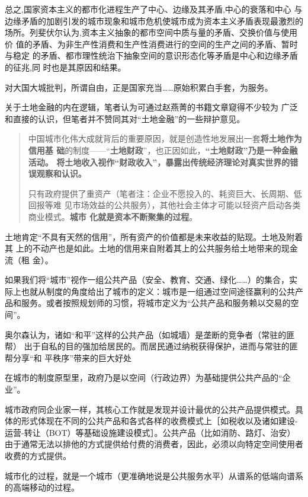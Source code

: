 总之,国家资本主义的都市化进程生产了中心、边缘及其矛盾,中心的衰落和中心
与边缘矛盾的加剧引发的城市现象和城市危机使城市成为资本主义矛盾表现最激烈的
场所。列斐伏尔认为,资本主义抽象的都市空间中质与量的矛盾、交换价值与使用价
值的矛盾、为非生产性消费和生产性消费进行的空间的生产之间的矛盾、暂时与稳定
的矛盾、都市理性统治下抽象空间的意识形态化等矛盾是中心和边缘矛盾的征兆,同
时也是其原因和结果。



对大国大城批判，所谓自由，正是国家充当……原始积累白手套，为服务。


关于土地金融的内在逻辑，笔者认为可通过赵燕菁的书籍文章\cite{dajueqi}窥得不少较为
广泛和直接的认识，但笔者并不赞同其对“土地金融”的一些辩护意见。
\begin{quotation}
  中国城市化伟大成就背后的重要原因，就是创造性地发展出一套\textbf{将土地作为信用基
    础}的制度——“\textbf{土地财政}”，也正因如此，\textbf{“土地财政”乃是一种金融活动。
    将土地收入视作“财政收入”，暴露出传统经济理论对真实世界的错误观察和认识。}

  只有政府提供了重资产（笔者注：企业不愿投入的、耗资巨大、长周期、低回报等难
  见市场效益的公共服务），其他社会主体才可能以轻资产启动各类商业模式。\textbf{城市
    化就是资本不断聚集的过程}。
\end{quotation}
土地肯定“不具有天然的信用”，所有资产的价值都是未来收益的贴现。土地及附着其
上的不动产也是如此。土地的信用来自附着其上的公共服务给土地带来的现金流（租
金）。


如果我们将“城市”视作一组公共产品（安全、教育、交通、绿化……）的集合，实际上也就从制度的角度给出了城市的定义：城市是一组通过空间途径赢利的公共产品和服务。或者按照规划师的习惯，将城市定义为“公共产品和服务赖以交易的空间”。

奥尔森认为，诸如“和平”这样的公共产品（如城墙）是垄断的竞争者（常驻的匪帮）
出于自私的目的强加给居民的。而居民通过纳税获得保护，进而与常驻的匪帮分享“和
平秩序”带来的巨大好处

在城市的制度原型里，政府乃是以空间（行政边界）为基础提供公共产品的“企业”。

城市政府同企业家一样，其核心工作就是发现并设计最优的公共产品提供模式。具体的形式体现在不同的公共产品和各式各样的收费模式上［如税收以及诸如建设-运营-转让（BOT）等基础设施建设模式］。公共产品（比如消防、路灯、治安）由于通常无法以排他的方式提供给付费的消费者，因此，必须以向特定空间使用者收费的方式提供。

城市化的过程，就是一个城市（更准确地说是公共服务水平）从谱系的低端向谱系的高端移动的过程。

